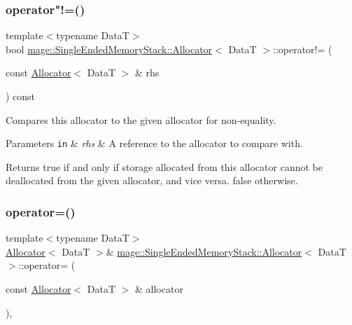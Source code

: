 \subsubsection{\texorpdfstring{operator"!=()}{operator!=()}}
{\footnotesize\ttfamily template$<$typename DataT$>$ \\
bool \hyperlink{structmage_1_1_single_ended_memory_stack_1_1_allocator}{mage\+::\+Single\+Ended\+Memory\+Stack\+::\+Allocator}$<$ DataT $>$\+::operator!= (\begin{DoxyParamCaption}\item[{const \hyperlink{structmage_1_1_single_ended_memory_stack_1_1_allocator}{Allocator}$<$ DataT $>$ \&}]{rhs }\end{DoxyParamCaption}) const\hspace{0.3cm}{\ttfamily [noexcept]}}

Compares this allocator to the given allocator for non-\/equality.


\begin{DoxyParams}[1]{Parameters}
\mbox{\tt in}  & {\em rhs} & A reference to the allocator to compare with. \\
\hline
\end{DoxyParams}
\begin{DoxyReturn}{Returns}
{\ttfamily true} if and only if storage allocated from this allocator cannot be deallocated from the given allocator, and vice versa. {\ttfamily false} otherwise. 
\end{DoxyReturn}
\hypertarget{structmage_1_1_single_ended_memory_stack_1_1_allocator_a5ceb3432ccb26bdf88b0e39775394cbf}{}\label{structmage_1_1_single_ended_memory_stack_1_1_allocator_a5ceb3432ccb26bdf88b0e39775394cbf} 
\subsubsection{\texorpdfstring{operator=()}{operator=()}\hspace{0.1cm}{\footnotesize\ttfamily [1/2]}}
{\footnotesize\ttfamily template$<$typename DataT$>$ \\
\hyperlink{structmage_1_1_single_ended_memory_stack_1_1_allocator}{Allocator}$<$ DataT $>$\& \hyperlink{structmage_1_1_single_ended_memory_stack_1_1_allocator}{mage\+::\+Single\+Ended\+Memory\+Stack\+::\+Allocator}$<$ DataT $>$\+::operator= (\begin{DoxyParamCaption}\item[{const \hyperlink{structmage_1_1_single_ended_memory_stack_1_1_allocator}{Allocator}$<$ DataT $>$ \&}]{allocator }\end{DoxyParamCaption})\hspace{0.3cm}{\ttfamily [delete]}, {\ttfamily [noexcept]}}


